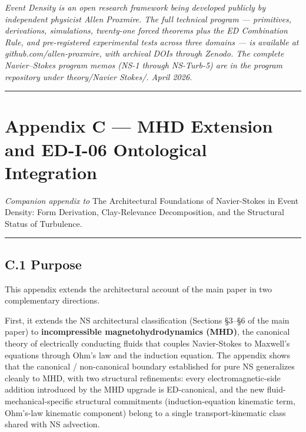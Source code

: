 \documentclass[
  11pt,a4paper]{article}
\begin{document}
\emph{Event Density is an open research framework being developed
publicly by independent physicist Allen Proxmire. The full technical
program --- primitives, derivations, simulations, twenty-one forced
theorems plus the ED Combination Rule, and pre-registered experimental
tests across three domains --- is available at
github.com/allen-proxmire, with archival DOIs through Zenodo. The
complete Navier--Stokes program memos (NS-1 through NS-Turb-5) are in
the program repository under theory/Navier Stokes/. April 2026.}

\begin{center}\rule{0.5\linewidth}{0.5pt}\end{center}

\section{Appendix C --- MHD Extension and ED-I-06 Ontological
Integration}\label{appendix-c-mhd-extension-and-ed-i-06-ontological-integration}

\emph{Companion appendix to} The Architectural Foundations of
Navier-Stokes in Event Density: Form Derivation, Clay-Relevance
Decomposition, and the Structural Status of Turbulence.

\begin{center}\rule{0.5\linewidth}{0.5pt}\end{center}

\subsection{C.1 Purpose}\label{c.1-purpose}

This appendix extends the architectural account of the main paper in two
complementary directions.

First, it extends the NS architectural classification (Sections §3--§6
of the main paper) to \textbf{incompressible magnetohydrodynamics
(MHD)}, the canonical theory of electrically conducting fluids that
couples Navier-Stokes to Maxwell's equations through Ohm's law and the
induction equation. The appendix shows that the canonical /
non-canonical boundary established for pure NS generalizes cleanly to
MHD, with two structural refinements: every electromagnetic-side
addition introduced by the MHD upgrade is ED-canonical, and the new
fluid-mechanical-specific structural commitments (induction-equation
kinematic term, Ohm's-law kinematic component) belong to a single
transport-kinematic class shared with NS advection.
\end{document}

